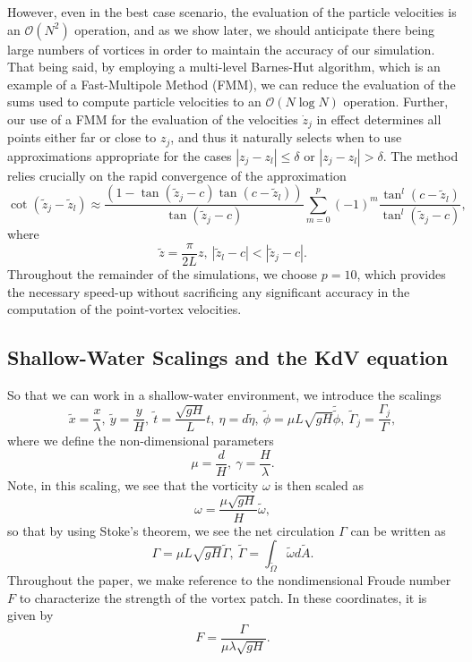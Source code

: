 \documentclass[a4paper,11pt]{article}
\begin{document}
However, even in the best case scenario, the evaluation of the particle velocities is an $\mathcal{O}(N^{2})$ operation, and as we show later, we should anticipate there being large numbers of vortices in order to maintain the accuracy of our simulation.  That being said, by employing a multi-level Barnes-Hut algorithm, which is an example of a Fast-Multipole Method (FMM), we can reduce the evaluation of the sums used to compute particle velocities to an $\mathcal{O}(N\log N)$ operation.  Further, our use of a FMM for the evaluation of the velocities $\dot{z}_{j}$ in effect determines all points either far or close to $z_{j}$, and thus it naturally selects when to use approximations appropriate for the cases  $|z_{j}-z_{l}|\leq\delta$ or $|z_{j}-z_{l}|>\delta$.  The method relies crucially on the rapid convergence of the approximation
\[
\cot\left(\tilde{z}_{j}-\tilde{z}_{l} \right) \approx \frac{\left(1-\tan(\tilde{z}_{j}-c)\tan(c-\tilde{z}_{l})\right)}{\tan\left(\tilde{z}_{j}-c\right)}\sum_{m=0}^{p}(-1)^{m}\frac{\tan^{l}\left(c-\tilde{z}_{l}\right)}{\tan^{l}\left(\tilde{z}_{j}-c\right)}, 
\]   
where
\[
\tilde{z} = \frac{\pi}{2L}z, ~ \left|\tilde{z}_{l}-c\right|<\left|\tilde{z}_{j}-c\right|.
\]
Throughout the remainder of the simulations, we choose $p=10$, which provides the necessary speed-up without sacrificing any significant accuracy in the computation of the point-vortex velocities.  
\subsection*{Shallow-Water Scalings and the KdV equation}
So that we can work in a shallow-water environment, we introduce the scalings 
\[
\tilde{x} = \frac{x}{\lambda}, ~\tilde{y} = \frac{y}{H}, ~ \tilde{t} = \frac{\sqrt{gH}}{L} t, ~ \eta = d\tilde{\eta}, ~ \tilde{\phi} = \mu L\sqrt{gH} \tilde{\tilde{\phi}}, ~ \tilde{\Gamma}_{j} = \frac{\Gamma_{j}}{\Gamma},
\]
where we define the non-dimensional parameters
\[
\mu= \frac{d}{H}, ~ \gamma = \frac{H}{\lambda}.  
\]
Note, in this scaling, we see that the vorticity $\omega$ is then scaled as 
\[
\omega = \frac{\mu \sqrt{gH}}{H}\tilde{\omega},
\]
so that by using Stoke's theorem, we see the net circulation $\Gamma$ can be written as 
\[
\Gamma = \mu L \sqrt{gH} \tilde{\Gamma}, ~ \tilde{\Gamma} = \int_{ \tilde{\Omega} } \tilde{\omega} d\tilde{A}.
\]
Throughout the paper, we make reference to the nondimensional Froude number $F$ to characterize the strength of the vortex patch.  In these coordinates, it is given by 
\[
F = \frac{\Gamma}{\mu \lambda \sqrt{gH}}.
\]
\end{document}
